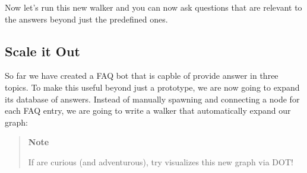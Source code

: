 Now let's run this new walker and you can now ask questions that are
relevant to the answers beyond just the predefined ones.

\subsection{Scale it Out}\label{scale-it-out}

So far we have created a FAQ bot that is capble of provide answer in
three topics. To make this useful beyond just a prototype, we are now
going to expand its database of answers. Instead of manually spawning
and connecting a node for each FAQ entry, we are going to write a walker
that automatically expand our graph:

\begin{Shaded}
    \begin{Highlighting}[]
        \OperatorTok{\{}
        \OperatorTok{;}
        \OperatorTok{:}\OperatorTok{-->} \OperatorTok{::}\OperatorTok{;}
        \OperatorTok{\{}
        \OperatorTok{=} \OperatorTok{;}
        \OperatorTok{\{}
        \OperatorTok{=}\NormalTok{ faq[}\NormalTok{]}\OperatorTok{;}
        \OperatorTok{-->} \OperatorTok{::}\OperatorTok{=}\OperatorTok{;}
        \OperatorTok{\}}
        \OperatorTok{\}}
        \OperatorTok{\}}
    \end{Highlighting}
\end{Shaded}

\begin{quote}
    \textbf{Note}

    If are curious (and adventurous), try visualizes this new graph via DOT!
\end{quote}

